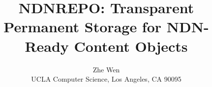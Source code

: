 \documentclass{sig-alternate-10pt}
\begin{document}
\title{NDNREPO: Transparent Permanent Storage for NDN-Ready Content Objects}



\author{Zhe Wen\\
UCLA Computer Science, Los Angeles, CA 90095}

\maketitle

\begin{sloppypar}




%


%
%
%
%
%







\small
\balance


%

%


\end{sloppypar}
\end{document}

